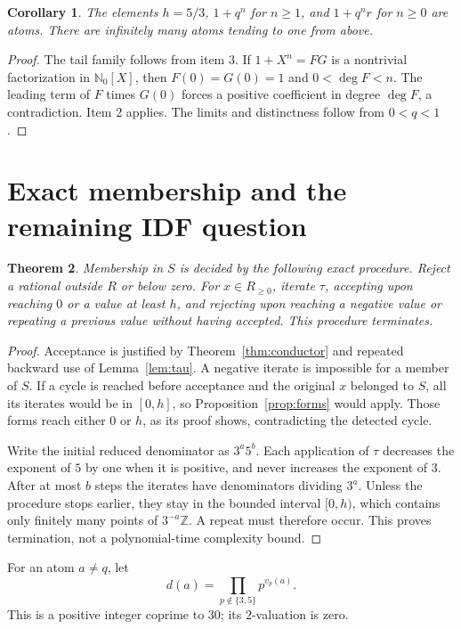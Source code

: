 \documentclass[11pt]{article}
\newtheorem{theorem}{Theorem}[section]
\newtheorem{corollary}[theorem]{Corollary}
\theoremstyle{definition}
\newcommand{\NN}{\mathbb N}
\newcommand{\ZZ}{\mathbb Z}
\begin{document}
\begin{corollary}
The elements $h=5/3$, $1+q^n$ for $n\ge1$, and $1+q^nr$ for
$n\ge0$ are atoms. There are infinitely many atoms tending to one
from above.
\end{corollary}
\begin{proof}
The tail family follows from item 3. If $1+X^n=FG$ is a nontrivial
factorization in $\NN_0[X]$, then $F(0)=G(0)=1$ and
$0<\deg F<n$. The leading term of $F$ times $G(0)$ forces a positive
coefficient in degree $\deg F$, a contradiction. Item 2 applies.
The limits and distinctness follow from $0<q<1$.
\end{proof}

\section{Exact membership and the remaining IDF question}
\begin{theorem}\label{thm:membership}
Membership in $S$ is decided by the following exact procedure.
Reject a rational outside $R$ or below zero. For $x\in R_{\ge0}$,
iterate $\tau$, accepting upon reaching $0$ or a value at least $h$,
and rejecting upon reaching a negative value or repeating a previous
value without having accepted. This procedure terminates.
\end{theorem}
\begin{proof}
Acceptance is justified by Theorem~\ref{thm:conductor} and repeated
backward use of Lemma~\ref{lem:tau}. A negative iterate is impossible
for a member of $S$.
If a cycle is reached before acceptance and the original $x$ belonged
to $S$, all its iterates would be in $[0,h]$, so
Proposition~\ref{prop:forms} would apply. Those forms reach either
$0$ or $h$, as its proof shows, contradicting the detected cycle.

Write the initial reduced denominator as $3^a5^b$.
Each application of $\tau$ decreases the exponent of $5$ by one
when it is positive, and never increases the exponent of $3$.
After at most $b$ steps the iterates have denominators dividing $3^a$.
Unless the procedure stops earlier, they stay in the bounded interval
$[0,h)$, which contains only finitely many points of $3^{-a}\ZZ$.
A repeat must therefore occur. This proves termination, not a
polynomial-time complexity bound.
\end{proof}

For an atom $a\ne q$, let
\[
 d(a)=\prod_{p\notin\{3,5\}}p^{v_p(a)}.
\]
This is a positive integer coprime to $30$; its $2$-valuation is zero.
\end{document}

